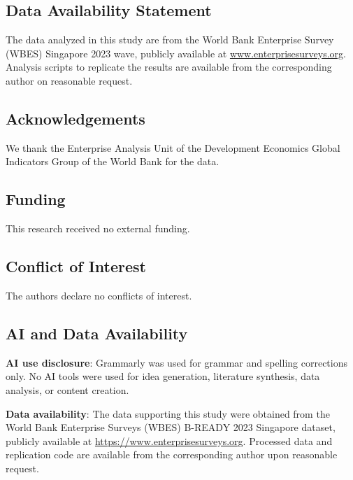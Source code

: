 \documentclass[12pt,a4paper]{article}
\begin{document}
\hypertarget{data-availability-statement}{%
\subsection{Data Availability
Statement}\label{data-availability-statement}}

The data analyzed in this study are from the World Bank Enterprise
Survey (WBES) Singapore 2023 wave, publicly available at
\href{http://www.enterprisesurveys.org}{www.enterprisesurveys.org}.
Analysis scripts to replicate the results are available from the
corresponding author on reasonable request.

\hypertarget{acknowledgements}{%
\subsection{Acknowledgements}\label{acknowledgements}}

We thank the Enterprise Analysis Unit of the Development Economics
Global Indicators Group of the World Bank for the data.

\hypertarget{funding}{%
\subsection{Funding}\label{funding}}

This research received no external funding.

\hypertarget{conflict-of-interest}{%
\subsection{Conflict of Interest}\label{conflict-of-interest}}

The authors declare no conflicts of interest.

\hypertarget{ai-and-data-availability}{%
\subsection{AI and Data Availability}\label{ai-and-data-availability}}

\textbf{AI use disclosure}: Grammarly was used for grammar and spelling
corrections only. No AI tools were used for idea generation, literature
synthesis, data analysis, or content creation.

\textbf{Data availability}: The data supporting this study were obtained
from the World Bank Enterprise Surveys (WBES) B-READY 2023 Singapore
dataset, publicly available at \url{https://www.enterprisesurveys.org}.
Processed data and replication code are available from the corresponding
author upon reasonable request.
\end{document}
